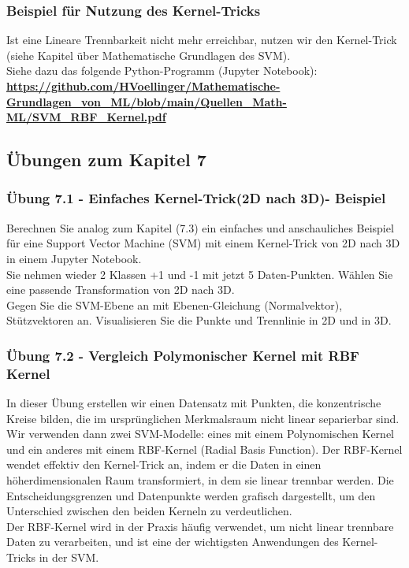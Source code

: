 \documentclass[12pt]{article}
\begin{document}
\subsubsection{Beispiel für Nutzung des Kernel-Tricks}
%
Ist eine Lineare Trennbarkeit nicht mehr erreichbar, nutzen wir den Kernel-Trick (siehe Kapitel über Mathematische Grundlagen des SVM).\\ 
Siehe dazu das folgende Python-Programm (Jupyter Notebook):\\[0.2cm]
\textbf{\url{https://github.com/HVoellinger/Mathematische-Grundlagen_von_ML/blob/main/Quellen_Math-ML/SVM_RBF_Kernel.pdf}}\\[0.2cm] 



 
\newpage

\subsection{Übungen zum Kapitel 7}

\subsubsection{Übung 7.1 - Einfaches Kernel-Trick(2D nach 3D)- Beispiel}
%
Berechnen Sie analog zum Kapitel (7.3) ein einfaches und anschauliches Beispiel für eine Support Vector Machine (SVM) mit einem Kernel-Trick von 2D nach 3D in einem Jupyter Notebook.\\
Sie nehmen wieder 2 Klassen +1 und -1 mit jetzt 5 Daten-Punkten. Wählen Sie eine passende Transformation von 2D nach 3D.\\
Gegen Sie die SVM-Ebene an mit Ebenen-Gleichung (Normalvektor), Stützvektoren an. Visualisieren Sie die Punkte und Trennlinie in 2D und in 3D. 

\subsubsection{Übung 7.2 - Vergleich Polymonischer Kernel mit RBF Kernel}
%
In dieser Übung erstellen wir einen Datensatz mit Punkten, die konzentrische Kreise bilden, die im ursprünglichen Merkmalsraum nicht linear separierbar sind. Wir verwenden dann zwei SVM-Modelle: eines mit einem Polynomischen Kernel und ein anderes mit einem RBF-Kernel (Radial Basis Function). Der RBF-Kernel wendet effektiv den Kernel-Trick an, indem er die Daten in einen höherdimensionalen Raum transformiert, in dem sie linear trennbar werden. Die Entscheidungsgrenzen und Datenpunkte werden grafisch dargestellt, um den Unterschied zwischen den beiden Kerneln zu verdeutlichen.\\
Der RBF-Kernel wird in der Praxis häufig verwendet, um nicht linear trennbare Daten zu verarbeiten, und ist eine der wichtigsten Anwendungen des Kernel-Tricks in der SVM.
%
\end{document}

